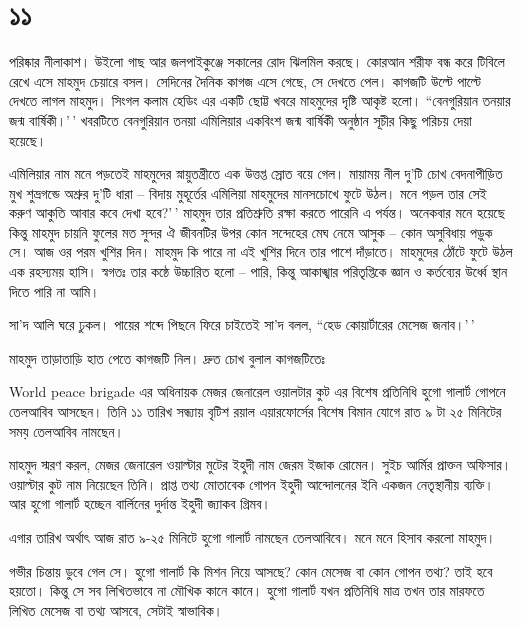 \documentclass[
]{book}
\begin{document}
\section*{১১}\label{ota-1-11}

পরিষ্কার নীলাকাশ। উইলো গাছ আর জলপাইকুঞ্জে সকালের রোদ ঝিলমিল করছে। কোরআন শরীফ বন্ধ করে টিবিলে রেখে এসে মাহমুদ চেয়ারে বসল। সেদিনের দৈনিক কাগজ এসে গেছে, সে দেখতে পেল। কাগজটি উল্টে পাল্টে দেখতে লাগল মাহমুদ। সিংগল কলাম হেডিং এর একটি ছোট্ট খবরে মাহমুদের দৃষ্টি আকৃষ্ট হলো। ``বেনগুরিয়ান তনয়ার জন্ম বার্ষিকী।'\,' খবরটিতে বেনগুরিয়ান তনয়া এমিলিয়ার একবিংশ জন্ম বার্ষিকী অনুষ্ঠান সূচীর কিছু পরিচয় দেয়া হয়েছে।

এমিলিয়ার নাম মনে পড়তেই মাহমুদের স্নায়ুতন্ত্রীতে এক উত্তপ্ত স্রোত বয়ে গেল। মায়াময় নীল দু'টি চোখ বেদনাপীড়িত মুখ শুভ্রগন্ডে অশ্রুর দু'টি ধারা -- বিদায় মুহূর্তের এমিলিয়া মাহমুদের মানসচোখে ফুটে উঠল। মনে পড়ল তার সেই করুণ আকুতি আবার কবে দেখা হবে?'\,' মাহমুদ তার প্রতিশ্রুতি রক্ষা করতে পারেনি এ পর্যন্ত। অনেকবার মনে হয়েছে কিন্তু মাহমুদ চায়নি ফুলের মত সুন্দর ঐ জীবনটির উপর কোন সন্দেহের মেঘ নেমে আসুক -- কোন অসুবিধায় পড়ুক সে। আজ ওর পরম খুশির দিন। মাহমুদ কি পারে না এই খুশির দিনে তার পাশে দাঁড়াতে। মাহমুদের ঠোঁটে ফুটে উঠল এক রহস্যময় হাসি। স্বগতঃ তার কন্ঠে উচ্চারিত হলো -- পারি, কিন্তু আকাঙ্খার পরিতৃপ্তিকে জ্ঞান ও কর্তব্যের উর্ধ্বে স্থান দিতে পারি না আমি।

সা'দ আলি ঘরে ঢুকল। পায়ের শব্দে পিছনে ফিরে চাইতেই সা'দ বলল, ``হেড কোয়ার্টারের মেসেজ জনাব।'\,'

মাহমুদ তাড়াতাড়ি হাত পেতে কাগজটি নিল। দ্রুত চোখ বুলাল কাগজটিতেঃ

World peace brigade এর অধিনায়ক মেজর জেনারেল ওয়ালটার কুট এর বিশেষ প্রতিনিধি হুগো গালার্ট গোপনে তেলআবিব আসছেন। তিনি ১১ তারিখ সন্ধ্যায় বৃটিশ রয়াল এয়ারফোর্সের বিশেষ বিমান যোগে রাত ৯ টা ২৫ মিনিটের সময় তেলআবিব নামছেন।

মাহমুদ স্মরণ করল, মেজর জেনারেল ওয়াল্টার মুটের ইহুদী নাম জেরম ইজাক রোমেন। সুইচ আর্মির প্রাক্তন অফিসার। ওয়াল্টার কুট নাম নিয়েছেন তিনি। প্রাপ্ত তথ্য মোতাবেক গোপন ইহুদী আন্দোলনের ইনি একজন নেতৃস্থানীয় ব্যক্তি। আর হুগো গালার্ট হচ্ছেন বার্লিনের দুর্দান্ত ইহুদী জ্যাকব গ্রিমব।

এগার তারিখ অর্থাৎ আজ রাত ৯-২৫ মিনিটে হুগো গালার্ট নামছেন তেলআবিবে। মনে মনে হিসাব করলো মাহমুদ।

গভীর চিন্তায় ডুবে গেল সে। হুগো গালার্ট কি মিশন নিয়ে আসছে? কোন মেসেজ বা কোন গোপন তথ্য? তাই হবে হয়তো। কিন্তু সে সব লিখিতভাবে না মৌখিক কানে কানে। হুগো গালার্ট যখন প্রতিনিধি মাত্র তখন তার মারফতে লিখিত মেসেজ বা তথ্য আসবে, সেটাই স্বাভাবিক।
\end{document}
